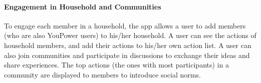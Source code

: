 
\paragraph{Engagement in Household and Communities} 
To engage each member in a household, the app allows a user to add members (who are also YouPower users) to his/her household. 
A user can see the actions of household members, and add their actions to his/her own action list.
% 
A user can also join communities and participate in discussions to exchange their ideas and share experiences. The top actions (the ones with most participants) in a community are displayed to members to introduce social norms. 




